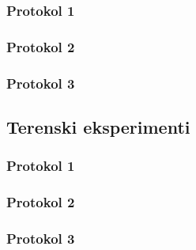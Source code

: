 \subsubsection{Protokol 1}











\subsubsection{Protokol 2}











\subsubsection{Protokol 3}












\subsection{Terenski eksperimenti}











\subsubsection{Protokol 1}














\subsubsection{Protokol 2}









\subsubsection{Protokol 3}










